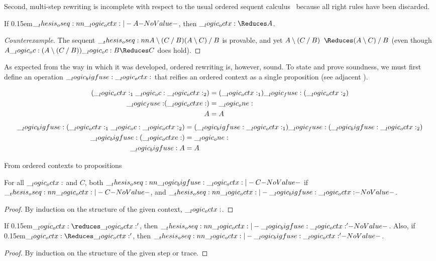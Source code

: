 Second, multi-step rewriting is incomplete with respect to the usual ordered sequent calculus~ because all right rules have been discarded.%
%
 \begin{falseclaim}[Completeness]
  If \kern0.15em$\oseq{\octx |- A}$, then\/ $\octx \Reduces A$.
\end{falseclaim}
%
\begin{proof}[Counterexample]
  The sequent $\oseq{A \limp (C \pmir B) |- (A \limp C) \pmir B}$ is provable, and yet $A \limp (C \pmir B) \Longarrownot\Reduces (A \limp C) \pmir B$ (even though $A \oc (A \limp (C \pmir B)) \oc B \Reduces C$ does hold).
\end{proof}
\noindent
As expected from the way in which it was developed, ordered rewriting is, however, sound.
To state and prove soundness, we must first define an operation $\__logic_bigfuse: \__logic_octx:$ that reifies an ordered context as a single proposition (see adjacent ).%
%
\begin{marginfigure}
  \begin{align*}
    (\__logic_octx:_1 \__logic_oc: \__logic_octx:_2) &= (\__logic_octx:_1) \__logic_fuse: (\__logic_octx:_2) \\
    \mathord{\text{$\__logic_fuse:$}} (\__logic_octxe:) &= \__logic_one: \\
    A &= A
  \end{align*}
  \begin{align*}
    \__logic_bigfuse: (\__logic_octx:_1 \__logic_oc: \__logic_octx:_2) &= (\__logic_bigfuse: \__logic_octx:_1) \__logic_fuse: (\__logic_bigfuse: \__logic_octx:_2) \\
    \__logic_bigfuse: (\__logic_octxe:) &= \__logic_one: \\
    \__logic_bigfuse: A &= A
  \end{align*}
  \caption{From ordered contexts to propositions}\label{fig:ordered-rewriting:bigfuse}
\end{marginfigure}%
%
\begin{lemma}
  For all $\__logic_octx:$ and $C$, both $\oseq{\bigfuse \octx |- C}$ if $\oseq{\octx |- C}$, and $\oseq{\octx |- \bigfuse \octx}$.
\end{lemma}
\begin{proof}
  By induction on the structure of the given context, $\__logic_octx:$.
\end{proof}
%
\begin{theorem}[Soundness]
  If \kern0.15em$\octx \reduces \octx'$, then\/ $\oseq{\octx |- \bigfuse \octx'}$.
  Also, if \kern0.15em$\octx \Reduces \octx'$, then\/ $\oseq{\octx |- \bigfuse \octx'}$.
\end{theorem}
%
\begin{proof}
  By induction on the structure of the given step or trace.
\end{proof}


